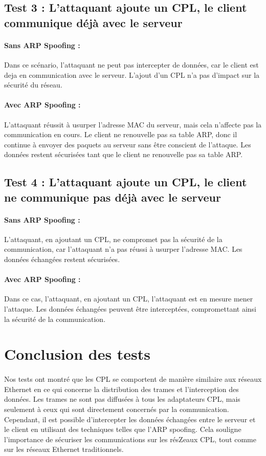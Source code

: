 \documentclass[a4paper,twocolumn]{report}
\begin{document}
\subsection{Test 3 : L'attaquant ajoute un CPL, le client communique déjà avec le serveur}
\paragraph{Sans ARP Spoofing :}
Dans ce scénario, l'attaquant ne peut pas intercepter de données,
car le client est deja en communication avec le serveur.
L'ajout d'un CPL n'a pas d'impact sur la sécurité du réseau.

\paragraph{Avec ARP Spoofing :}
L'attaquant réussit à usurper l'adresse MAC du serveur,
mais cela n'affecte pas la communication en cours.
Le client ne renouvelle pas sa table ARP, donc il continue à envoyer des paquets
au serveur sans être conscient de l'attaque. Les données restent sécurisées tant
que le client ne renouvelle pas sa table ARP.

\subsection{Test 4 : L'attaquant ajoute un CPL, le client ne communique pas déjà avec le serveur}
\paragraph{Sans ARP Spoofing :}
L'attaquant, en ajoutant un CPL, ne compromet pas la sécurité de la communication,
car l'attaquant n'a pas réussi à usurper l'adresse MAC. Les données échangées restent sécurisées.

\paragraph{Avec ARP Spoofing :}
Dans ce cas, l'attaquant, en ajoutant un CPL, l'attaquant est en mesure mener l'attaque.
Les données échangées peuvent être interceptées, compromettant ainsi la sécurité de la communication.



\section{Conclusion des tests}
\paragraph{}Nos tests ont montré que les CPL se comportent de manière similaire
aux réseaux Ethernet en ce qui concerne la distribution des trames et l'interception des données.
Les trames ne sont pas diffusées à tous les adaptateurs CPL, mais seulement
à ceux qui sont directement concernés par la communication. Cependant,
il est possible d'intercepter les données échangées entre le serveur et le client
en utilisant des techniques telles que l'ARP spoofing. Cela souligne l'importance de
sécuriser les communications sur les résZeaux CPL, tout comme sur les réseaux Ethernet traditionnels.
\end{document}
